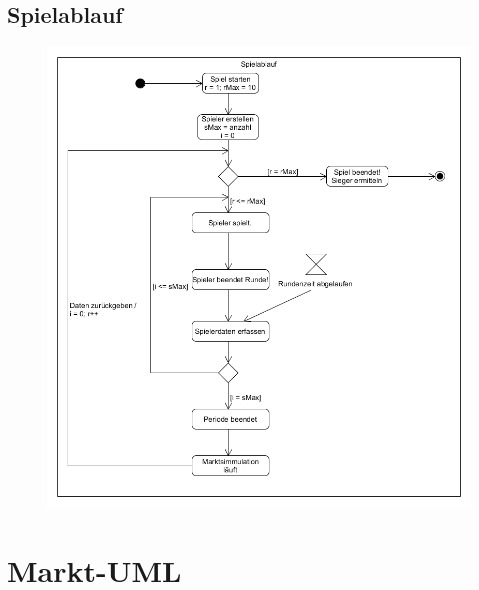 \subsection{Spielablauf}
\begin{figure} [!h]
	\centering
	\includegraphics[scale=0.5]{img/Spielablauf.png} 
\end{figure}
\clearpage
\section{Markt-UML}

